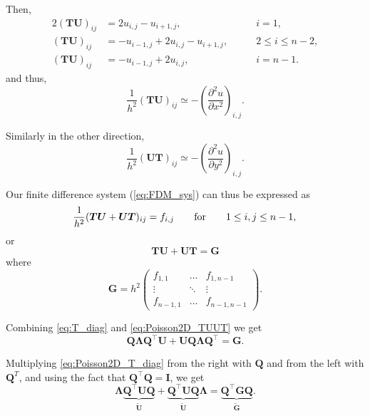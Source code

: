 Then,
\begin{alignat*}{2}
  (\bm T \bm U)_{ij} &= 2u_{i,j} - u_{i+1,j}, & \qquad i=1, \\
  (\bm T \bm U)_{ij} &= -u_{i-1,j}+2u_{i,j} - u_{i+1,j}, &\qquad 2 \leq i \leq n-2, \\
  (\bm T \bm U)_{ij} &= -u_{i-1,j}+2u_{i,j}, &\qquad i=n-1.
\end{alignat*}
and thus,
\begin{equation}
  \frac{1}{h^2} (\bm T \bm U)_{ij} \simeq
  - \left( \frac{\partial^2 u}{\partial x^2} \right)_{i,j}.
\end{equation}

Similarly in the other direction,
\begin{equation}
  \frac{1}{h^2} (\bm U \bm T)_{ij} \simeq
  - \left( \frac{\partial^2 u}{\partial y^2} \right)_{i,j}.
\end{equation}

Our finite difference system (\ref{eq:FDM_sys}) can thus be expressed as
\begin{equation*}
  \frac{1}{h^2} (\bm T \bm U + \bm U \bm T)_{ij} = f_{i,j}
  \qquad \text{for} \qquad 1 \leq i,j \leq n-1, \\
\end{equation*}
or
\begin{equation}
  \bm T \bm U + \bm U \bm T = \bm G
  \label{eq:Poisson2D_TUUT}
\end{equation}
where
\begin{equation*}
  \bm G = h^2
  \begin{pmatrix}
    f_{1,1} & \ldots & f_{1,n-1} \\
    \vdots & \ddots & \vdots \\
    f_{n-1,1} & \ldots & f_{n-1,n-1}
  \end{pmatrix}.
\end{equation*}

Combining \eqref{eq:T_diag} and \eqref{eq:Poisson2D_TUUT} we get
\begin{equation}
  \bm Q \bm \Lambda \bm Q^\intercal \bm U + \bm U \bm Q \bm \Lambda \bm Q^\intercal = \bm {G}.
  \label{eq:Poisson2D_T_diag}
\end{equation}

Multiplying \eqref{eq:Poisson2D_T_diag} from the right with $\bm Q$ and from the
left with $\bm Q^T$, and using the fact that $\bm Q^\intercal \bm Q = \bm I$, we
get
\begin{equation*}
  \bm \Lambda \underbrace{\bm Q^\intercal \bm U \bm Q}_{\tilde{\bm U}} +
  \underbrace{\bm Q^\intercal \bm U \bm Q}_{\tilde{\bm U}} \bm \Lambda =
  \underbrace{\bm Q^\intercal \bm G \bm Q}_{\tilde{\bm G}}.
\end{equation*}

